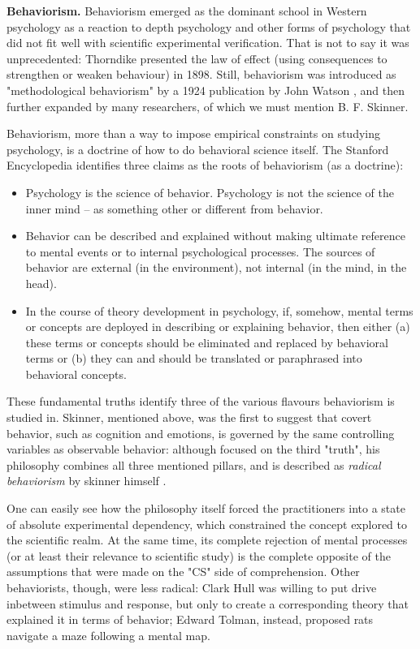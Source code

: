 \documentclass[../main.tex]{subfiles}
\begin{document}
\vspace{4pt}
\textbf{Behaviorism.} Behaviorism emerged as the dominant school in Western psychology as a reaction to depth psychology and other forms of psychology that did not fit well with scientific experimental verification. That is not to say it was unprecedented: Thorndike presented the law of effect (using consequences to strengthen or weaken behaviour) in 1898. Still, behaviorism was introduced as "methodological behaviorism" by a 1924 publication by John Watson \cite{watsonUnverbalizedHumanBehavior1924}, and then further expanded by many researchers, of which we must mention B. F. Skinner.

Behaviorism, more than a way to impose empirical constraints on studying psychology, is a doctrine of how to do behavioral science itself. The Stanford Encyclopedia identifies three claims as the roots of behaviorism (as a doctrine):
\begin{itemize}
    \item Psychology is the science of behavior. Psychology is not the science of the inner mind – as something other or different from behavior.
    \item Behavior can be described and explained without making ultimate reference to mental events or to internal psychological processes. The sources of behavior are external (in the environment), not internal (in the mind, in the head).
    \item In the course of theory development in psychology, if, somehow, mental terms or concepts are deployed in describing or explaining behavior, then either (a) these terms or concepts should be eliminated and replaced by behavioral terms or (b) they can and should be translated or paraphrased into behavioral concepts.
\end{itemize}
These fundamental truths identify three of the various flavours behaviorism is studied in. Skinner, mentioned above, was the first to suggest that covert behavior, such as cognition and emotions, is governed by the same controlling variables as observable behavior: although focused on the third "truth", his philosophy combines all three mentioned pillars, and is described as \textit{radical behaviorism} by skinner himself \cite{skinnerBehaviorism1974}.

One can easily see how the philosophy itself forced the practitioners into a state of absolute experimental dependency, which constrained the concept explored to the scientific realm. At the same time, its complete rejection of mental processes (or at least their relevance to scientific study) is the complete opposite of the assumptions that were made on the "CS" side of comprehension. Other behaviorists, though, were less radical: Clark Hull was willing to put drive inbetween stimulus and response, but only to create a corresponding theory that explained it in terms of behavior\cite{hullGoalAttractionDirecting1931}; Edward Tolman, instead, proposed rats navigate a maze following a mental map\cite{tolmanCognitiveMapsRats1948}.
\end{document}

